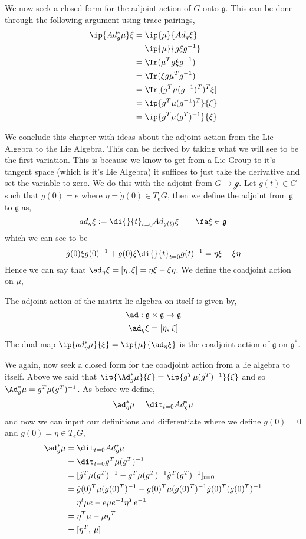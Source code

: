 \noindent
We now seek a closed form for the adjoint action of $G$ onto $\mathfrak{g}$. This can be done through the following argument using trace pairings,
\begin{align*}
  \ip {Ad^*_g \mu} \xi &= \ip {\mu} {Ad_g\xi}\\
  &= \ip {\mu} {g\xi g^{-1}}\\
  &= \Tr(\mu^Tg\xi g^{-1})\\
  &= \Tr(\xi g\mu^Tg^{-1})\\
  &= \Tr [(g^T\mu(g^{-1})^T)^T\xi]\\
  &= \ip{g^T\mu (g^{-1})^T} {\xi}\\
  &= \ip{g^T\mu (g^T)^{-1}} {\xi}\\
\end{align*}

\noindent
We conclude this chapter with ideas about the adjoint action from the Lie Algebra to the Lie Algebra. This can be derived by taking what we will see to be the first variation. This is because we know to get from a Lie Group to it's tangent space (which is it's Lie Algebra) it suffices to just take the derivative and set the variable to zero. We do this with the adjoint from $G \to \mathcal{g}$. Let $g(t) \in G$ such that $g(0) = e$ where $\eta = \dot g (0) \in T_eG$, then we define the adjoint from $\mathfrak{g}$ to $\mathfrak{g}$ as,
$$ ad_\eta \xi := \di {}{t} _{t = 0} Ad_{g(t)}\xi \qquad \fa \xi \in \mathfrak{g} $$
which we can see to be
$$ \dot g(0)\xi g(0)^{-1} + g(0)\xi \di {}{t}_{t=0} g(t)^{-1}= \eta\xi - \xi\eta $$
Hence we can say that $\ad_{\eta}\xi = [\eta, \xi] = \eta\xi - \xi\eta$. We define the coadjoint action on $\mu$,
\begin{ndefi}
  The adjoint action of the matrix lie algebra on itself is given by,
  $$ \ad : \mathfrak{g}\times \mathfrak{g} \to \mathfrak{g} $$
  $$ \ad_\eta \xi = [\eta,\, \xi] $$
  The dual map $\ip{ad^*_\eta \mu}{\xi} = \ip{\mu}{\ad_\eta \xi}$ is the coadjoint action of $\mathfrak{g}$ on $\mathfrak{g}^*$.
\end{ndefi}
\noindent
We again, now seek a closed form for the coadjoint action from a lie algebra to itself. Above we said that $\ip{\Ad^*_g\mu}{\xi} = \ip{g^T \mu (g^T)^{-1}}{\xi}$ and so $\Ad^*_g \mu = g^T \mu (g^T)^{-1}$. As before we define,
$$ \ad^*_g \mu = \dit_{t=0} Ad_g^* \mu $$
and now we can input our definitions and differentiate where we define $g(0) = 0$ and $\dot g (0) = \eta \in T_eG$,
\begin{align*}
  \ad^*_g \mu &= \dit_{t=0} Ad_g^* \mu \\
  &= \dit_{t=0} g^T \mu (g^T)^{-1} \\
  &= [\dot g^T \mu (g^T)^{-1} - g^T \mu (g^T)^{-1}\dot g^T (g^T)^{-1}]_{t=0} \\
  &= \dot g(0)^T \mu (g(0)^T)^{-1} - g(0)^T \mu (g(0)^T)^{-1}\dot g(0)^T (g(0)^T)^{-1} \\
  &= \eta^t \mu e - e \mu e^{-1} \eta^T e^{-1} \\
  &= \eta^T \mu - \mu \eta^T \\
  &= [\eta^T,\,\mu]
\end{align*}
